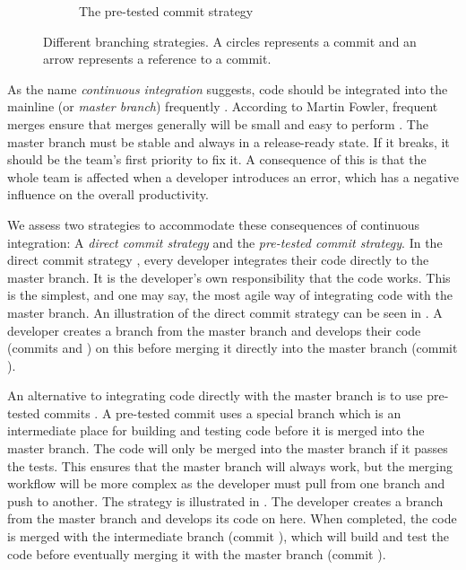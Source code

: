 \begin{figure}
\begin{subfigure}[b]{\linewidth}
\caption{The pre-tested commit strategy}\label{fig:commit_stratagy_b}
\end{subfigure}
\caption[Different branching strategies]{Different branching strategies. A circles represents a commit and an arrow represents a reference to a commit.}\label{fig:commit_stratagy}
\end{figure}

As the name \emph{continuous integration} suggests, code should be integrated into the mainline (or \emph{master branch}) frequently \parencite{fowlerCI}. According to Martin Fowler, frequent merges ensure that merges generally will be small and easy to perform \parencite{fowlerFeatureBranch}. The master branch must be stable and always in a release-ready state. If it breaks, it should be the team's first priority to fix it. A consequence of this is that the whole team is affected when a developer introduces an error, which has a negative influence on the overall productivity.

We assess two strategies to accommodate these consequences of continuous integration: A \emph{direct commit strategy} and the \emph{pre-tested commit strategy}. In the direct commit strategy \parencite{git_branching_workflows2015}, every developer integrates their code directly to the master branch. It is the developer's own responsibility that the code works. This is the simplest, and one may say, the most agile way of integrating code with the master branch. An illustration of the direct commit strategy can be seen in . A developer creates a branch from the master branch and develops their code (commits  and ) on this before merging it directly into the master branch (commit ).

An alternative to integrating code directly with the master branch is to use pre-tested commits \parencite{fowlerPendingHead}. A pre-tested commit uses a special branch which is an intermediate place for building and testing code before it is merged into the master branch. The code will only be merged into the master branch if it passes the tests. This ensures that the master branch will always work, but the merging workflow will be more complex as the developer must pull from one branch and push to another. The strategy is illustrated in . The developer creates a branch from the master branch and develops its code on here. When completed, the code is merged with the intermediate branch (commit \emph{}), which will build and test the code before eventually merging it with the master branch (commit ).


